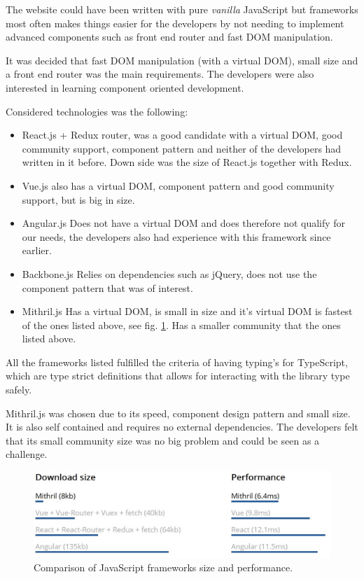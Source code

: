 \documentclass[12pt,a4paper]{report}
\begin{document}
The website could have been written with pure \textit{vanilla} JavaScript but frameworks most often makes things easier for the developers by not needing to implement advanced components such as front end router and fast DOM manipulation.

It was decided that fast DOM manipulation (with a virtual DOM), small size and a front end router was the main requirements. The developers were also interested in learning component oriented development.

Considered technologies was the following:
\begin{itemize}
    \item React.js + Redux router, was a good candidate with a virtual DOM, good community support, component pattern and neither of the developers had written in it before. Down side was the size of React.js together with Redux.
    \item Vue.js also has a virtual DOM, component pattern and good community support, but is big in size.
    \item Angular.js Does not have a virtual DOM and does therefore not qualify for our needs, the developers also had experience with this framework since earlier.
    \item Backbone.js Relies on dependencies such as jQuery, does not use the component pattern that was of interest.
    \item Mithril.js Has a virtual DOM, is small in size and it's virtual DOM is fastest of the ones listed above, see fig. \ref{fig:js-comp}. Has a smaller community that the ones listed above.
\end{itemize}

All the frameworks listed fulfilled the criteria of having typing's for TypeScript, which are type strict definitions that allows for interacting with the library type safely.

Mithril.js\cite{mithril-js} was chosen due to its speed, component design pattern and small size. It is also self contained and requires no external dependencies. The developers felt that its small community size was no big problem and could be seen as a challenge.

\begin{figure}[H]
  \centering
  \includegraphics[width=14cm]{mithril-js-perf.jpg}
  \caption{Comparison of JavaScript frameworks size and performance\cite{mithril-speed}.}
  \label{fig:js-comp}
\end{figure}
\end{document}
